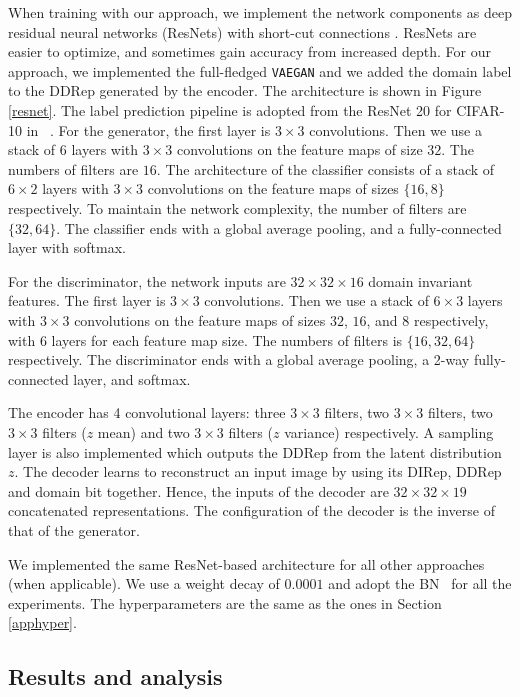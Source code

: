 \documentclass{article}
\begin{document}
When training with our approach, we implement the network components as deep residual neural networks (ResNets) with short-cut connections \cite{he2016deep}. ResNets are easier to optimize, and sometimes gain accuracy from increased depth. For our approach, we implemented the full-fledged \verb"VAEGAN" and we added the domain label to the DDRep generated by the encoder. The architecture is shown in Figure \ref{resnet}. The label prediction pipeline is adopted from the ResNet 20 for CIFAR-10 in ~\cite{he2016deep}. For the generator, the first layer is $3\times3$ convolutions. Then we use a stack of $6$ layers with $3\times3$ convolutions on the feature maps of size $32$. The numbers of filters are $16$. The architecture of the classifier consists of a stack of $6\times2$ layers with $3\times3$ convolutions on the feature maps of sizes $\{16, 8\}$ respectively. To maintain the network complexity, the number of filters are $\{32, 64\}$. The classifier ends with a global average pooling,  and a fully-connected layer with softmax. 

For the discriminator, the network inputs are $32\times32\times16$ domain invariant features. The first layer is $3\times3$ convolutions. Then we use a stack of $6\times3$ layers with $3\times3$ convolutions on the feature maps of sizes $32$, $16$, and $8$ respectively, with $6$ layers for each feature map size. The numbers of filters is $\{16, 32, 64\}$ respectively. The discriminator ends with a global average pooling, a 2-way fully-connected layer, and softmax. 

The encoder has 4 convolutional layers: three $3\times3$ filters, two $3\times3$ filters, two $3\times3$ filters ($z$ mean) and two $3\times3$ filters ($z$ variance) respectively. A sampling layer is also implemented which outputs the DDRep from the latent distribution $z$. The decoder learns to reconstruct an input image by using its DIRep, DDRep and domain bit together. Hence, the inputs of the decoder are $32\times32\times19$ concatenated representations. %
The configuration of the decoder is the inverse of that of the generator. 

We implemented the same ResNet-based architecture for all other approaches (when applicable). We use a weight decay of $0.0001$ and adopt the BN~\cite{ioffe2015batch} for all the experiments. The hyperparameters are the same as the ones in Section \ref{apphyper}.

\subsection{Results and analysis}
\end{document}
